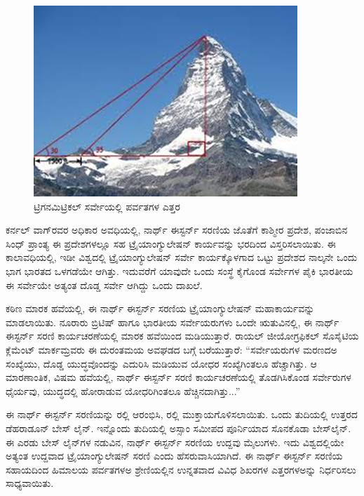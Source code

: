\begin{figure}[!htbp]
\includegraphics[scale=0.65]{"images/image018.jpg"}
\caption{ಟ್ರಿಗನಮಿಟ್ರಿಕಲ್​ ಸರ್ವೇಯಲ್ಲಿ ಪರ್ವತಗಳ ಎತ್ತರ}\label{art14-fig1}
\end{figure}

ಕರ್ನಲ್​ ವಾಗ್​ರವರ ಅಧಿಕಾರ ಅವಧಿಯಲ್ಲಿ, ನಾರ್ಥ್ ಈಸ್ಟರ್ನ್ ಸರಣಿಯ ಜೊತೆಗೆ ಕಾಶ್ಮೀರ ಪ್ರದೇಶ, ಪಂಜಾಬಿನ ಸಿಂಧ್​ ಪ್ರಾಂತ್ಯ ಈ ಪ್ರದೇಶಗಳಲ್ಲೂ ಸಹ ಟ್ರೈಯಾಂಗ್ಯುಲೇಷನ್​ ಕಾರ್ಯವನ್ನು ಭರದಿಂದ ವಿಸ್ತರಿಸಲಾಯಿತು. ಈ ಕಾಲಾವಧಿಯಲ್ಲಿ, ಇಡೀ ವಿಶ್ವದಲ್ಲಿ ಟ್ರೈಯಾಂಗ್ಯುಲೇಷನ್​ ಸರ್ವೇ ಕಾರ್ಯಕ್ಕೊಳಗಾದ ಒಟ್ಟು ಪ್ರದೇಶದ ನಾಲ್ಕನೇ ಒಂದು ಭಾಗ ಭಾರತದ ಒಳಗಡೆಯೇ ಆಗಿತ್ತು. ಇದುವರೆಗೆ ಯಾವುದೇ ಒಂದು ಸಂಸ್ಥೆ ಕೈಗೊಂಡ ಸರ್ವೇಗಳ ಪೈಕಿ ಭಾರತೀಯ ಈ ಸರ್ವೇಯೇ ಅತ್ಯಂತ ದೊಡ್ಡ ಸರ್ವೇ ಆಗಿದ್ದು ಒಂದು ದಾಖಲೆ.

\vskip 4pt

ಕಠಿಣ ಮಾರಕ ಹವೆಯಲ್ಲಿ, ಈ ನಾರ್ಥ್ ಈಸ್ಟರ್ನ್ ಸರಣಿಯ ಟ್ರೈಯಾಂಗ್ಯುಲೇಷನ್​ ಮಹಾಕಾರ್ಯವನ್ನು ಮಾಡಲಾಯಿತು. ನೂರಾರು ಬ್ರಿಟಿಷ್​ ಹಾಗೂ ಭಾರತೀಯ ಸರ್ವೇಯರುಗಳು ಒಂದೇ ಋತುವಿನಲ್ಲಿ, ಈ ನಾರ್ಥ್ ಈಸ್ಟರ್ನ್ ಸರಣಿ ಕಾರ್ಯಚರಣೆಯಲ್ಲಿ ಮಾರಕ ಹವೆಯಿಂದ ಮಡಿಯುತ್ತಾರೆ. ರಾಯಲ್​ ಜೀಯೋಗ್ರಫಿಕಲ್​ ಸೊಸೈಟಿಯ ಕ್ಲೆಮೆಂಟ್​ ಮಾರ್ಕಮ್ರವರು ಈ ದುರಂತಮಯ ಅವಘಡದ ಬಗ್ಗೆ ಬರೆಯುತ್ತಾರೆ: “ಸರ್ವೇಯರುಗಳ ಮರಣದಅ ಸಂಖ್ಯೆಯು, ದೊಡ್ಡ ಯುದ್ಧವೊಂದನ್ನು ಎದುರಿಸಿ ಮಡಿಯುವ ಯೋಧರ ಸಂಖ್ಯೆಗಿಂತಲೂ ಹೆಚ್ಚಾಗಿತ್ತು. ಆ ಮಾರಣಾಂತಿಕ, ವಿಷಮ ಹವೆಯಲ್ಲಿ, ನಾರ್ಥ್ ಈಸ್ಟರ್ನ್ ಸರಣಿ ಕಾರ್ಯಚರಣೆಯಲ್ಲಿ ತೊಡಗಿಸಿಕೊಂಡ ಸರ್ವೇರುಗಳ ಧೈರ್ಯವು, ಯುದ್ಧದಲ್ಲಿ ಹೋರಾಡುವ ಯೋಧರಿಗಿಂತಲೂ ಹೆಚ್ಚಿನದಾಗಿತ್ತು...”

\newpage

ಈ ನಾರ್ಥ್ ಈಸ್ಟರ್ನ್ ಸರಣಿಯನ್ನು  ರಲ್ಲಿ ಆರಂಭಿಸಿ,  ರಲ್ಲಿ ಮುಕ್ತಾಯಗೊಳಿಸಲಾಯಿತು. ಒಂದು ತುದಿಯಲ್ಲಿ ಉತ್ತರದ ಡೆಹರಾಡೂನ್​ ಬೇಸ್​ ಲೈನ್​. ಇನ್ನೊಂದು ತುದಿಯಲ್ಲಿ ಅಸ್ಸಾಂ ಸಮೀಪದ ಪೂರ್ನಿಯಾದ ಸೊನಕೊಡಾ ಬೇಸ್​ ಲೈನ್​. ಈ ಎರಡು ಬೇಸ್​ ಲೈನ್​ಗಳ ನಡುವಿನ, ನಾರ್ಥ್ ಈಸ್ಟರ್ನ್ ಸರಣಿಯ ಉದ್ದವು  ಮೈಲುಗಳು. ಇದು ವಿಶ್ವದಲ್ಲಿಯೇ ಅತ್ಯಂತ ಉದ್ದವಾದ ಟ್ರೈಯಾಂಗ್ಯುಲೇಷನ್​ ಸರಣಿ ಎಂದು ಹೆಸರುವಾಸಿಯಾಗಿದೆ. ಈ ನಾರ್ಥ್ ಈಸ್ಟರ್ನ್ ಸರಣಿಯ ಸಹಾಯದಿಂದ ಹಿಮಾಲಯ ಪರ್ವತಗಳಅ ಶ್ರೇಣಿಯಲ್ಲಿನ ಉನ್ನತವಾದ  ವಿವಿಧ ಶಿಖರಗಳ ಎತ್ತರಗಳಅನ್ನು ನಿರ್ಧರಿಸಲು ಸಾಧ್ಯವಾಯಿತು.

